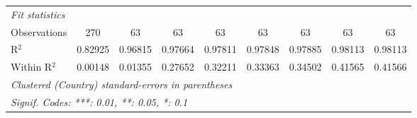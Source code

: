 \begin{table}[htbp]
\begin{tabular}{lcccccccc}
      \midrule
      \emph{Fit statistics}\\
      Observations                                                                     & 270      & 63       & 63              & 63              & 63              & 63              & 63              & 63\\  
      R$^2$                                                                            & 0.82925  & 0.96815  & 0.97664         & 0.97811         & 0.97848         & 0.97885         & 0.98113         & 0.98113\\  
      Within R$^2$                                                                     & 0.00148  & 0.01355  & 0.27652         & 0.32211         & 0.33363         & 0.34502         & 0.41565         & 0.41566\\  
      \midrule \midrule
      \multicolumn{9}{l}{\emph{Clustered (Country) standard-errors in parentheses}}\\
      \multicolumn{9}{l}{\emph{Signif. Codes: ***: 0.01, **: 0.05, *: 0.1}}\\
   \end{tabular}
\end{table}


